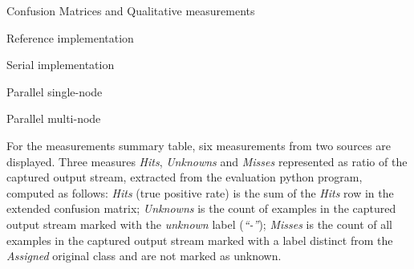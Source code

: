 %   

\begin{table}[htb]
\caption{Confusion Matrices and Qualitative measurements}
\label{tab:confusion-matrixes-ref-serial}
\begin{subtable}[h]{\textwidth}\begin{center}
    \caption{Reference implementation}
    
    \label{tab:java-matrix}
\end{center}\end{subtable}
\begin{subtable}[h]{\textwidth}\begin{center}
    \whencolumns{}{\vspace{5mm}}
    \caption{Serial implementation}
    
    \label{tab:libc-matrix}
    \whencolumns{}{\vspace{5mm}}
\end{center}\end{subtable}
\begin{subtable}[h]{0.5\textwidth}\begin{center}
  \caption{Parallel single-node}
  
  \label{tab:single-node-matrix}
\end{center}\end{subtable}
\begin{subtable}[h]{0.5\textwidth}\begin{center}
  \caption{Parallel multi-node}
  
  \label{tab:multi-node-matrix}
\end{center}\end{subtable}
\end{table}

For the measurements summary table, six measurements from two sources are displayed. Three
measures \emph{Hits}, \emph{Unknowns} and \emph{Misses} represented as ratio of
the captured output stream, extracted from the evaluation python program,
computed as follows:
\emph{Hits} (true positive rate) is the sum of the \emph{Hits} row in the
extended confusion matrix;
\emph{Unknowns} is the count of examples in the captured output stream marked
with the \emph{unknown} label (\emph{``-''});
\emph{Misses} is the count of all examples in the captured output stream marked
with a label distinct from the \emph{Assigned} original class and are not marked
as unknown.

